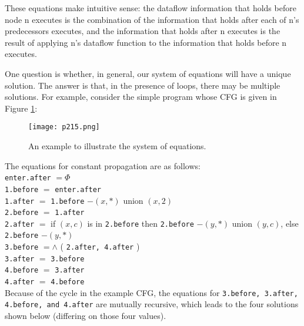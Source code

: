 These equations make intuitive sense: the dataflow information that holds
before node n executes is the combination of the information that holds after
each of n's predecessors executes, and the information that holds after n
executes is the result of applying n's dataflow function to the information
that holds before n executes.

One question is whether, in general, our system of equations will have a
unique solution. The answer is that, in the presence of loops, there may
be multiple solutions. For example, consider the simple program whose CFG
is given in Figure \ref{fig:p215}:


\begin{figure}[H]
	\centering
	\texttt{[image: p215.png]}
	\caption{An example to illustrate the system of equations.}
	\label{fig:p215}
\end{figure}

The equations for constant propagation are as follows:\\
{
\texttt{enter.after} $= \Phi $ \\
\texttt{1.before} $=$  \texttt{enter.after} \\
\texttt{1.after} $=$ \texttt{1.before} $-(x, *)$ {\color{red} union} $(x, 2)$  \\
\texttt{2.before} $=$ \texttt{1.after} \\
\texttt{2.after} $=$ if $(x, c)$ is in  \texttt{2.before} then  \texttt{2.before} $-(y, *)$ {\color{red} union} $(y, c)$, else  \texttt{2.before} $-(y, *)$  \\
\texttt{3.before} $= \wedge $ ( \texttt{2.after, 4.after} ) \\
\texttt{3.after} $=$  \texttt{3.before} \\
\texttt{4.before} $=$  \texttt{3.after} \\
\texttt{4.after} $=$  \texttt{4.before} \\
}
Because of the cycle in the example CFG, the equations for  \texttt{3.before,
	3.after, 4.before, and 4.after} are mutually recursive, which leads to the
four solutions shown below (differing on those four values).

